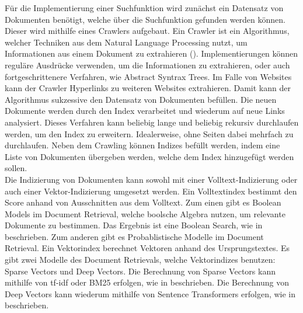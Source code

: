 Für die Implementierung einer Suchfunktion wird zunächst ein Datensatz von Dokumenten benötigt, welche über die Suchfunktion gefunden werden können.
Dieser wird mithilfe eines Crawlers aufgebaut.
Ein Crawler ist ein Algorithmus, welcher Techniken aus dem Natural Language Processing nutzt, um Informationen aus einem Dokument zu extrahieren (\cite{Khder_2021}).
Implementierungen können reguläre Ausdrücke verwenden, um die Informationen zu extrahieren, oder auch fortgeschrittenere Verfahren, wie Abstract Syntrax Trees.
Im Falle von Websites kann der Crawler Hyperlinks zu weiteren Websites extrahieren.
Damit kann der Algorithmus sukzessive den Datensatz von Dokumenten befüllen.
Die neuen Dokumente werden durch den Index verarbeitet und wiederum auf neue Links analysiert.
Dieses Verfahren kann beliebig lange und beliebig rekursiv durchlaufen werden, um den Index zu erweitern.
Idealerweise, ohne Seiten dabei mehrfach zu durchlaufen.
Neben dem Crawling können Indizes befüllt werden, indem eine Liste von Dokumenten übergeben werden, welche dem Index hinzugefügt werden sollen.\\

Die Indizierung von Dokumenten kann sowohl mit einer Volltext-Indizierung oder auch einer Vektor-Indizierung umgesetzt werden.
Ein Volltextindex bestimmt den Score anhand von Ausschnitten aus dem Volltext.
Zum einen gibt es Boolean Models im Document Retrieval, welche boolsche Algebra nutzen, um relevante Dokumente zu bestimmen.
Das Ergebnis ist eine Boolean Search, wie in  beschrieben.
Zum anderen gibt es Probablistische Modelle im Document Retrieval.
Ein Vektorindex berechnet Vektoren anhand des Ursprungstextes.
Es gibt zwei Modelle des Document Retrievals, welche Vektorindizes benutzen: Sparse Vectors und Deep Vectors.
Die Berechnung von Sparse Vectors kann mithilfe von tf-idf oder BM25 erfolgen, wie in  beschrieben.
Die Berechnung von Deep Vectors kann wiederum mithilfe von Sentence Transformers erfolgen, wie in  beschrieben.

